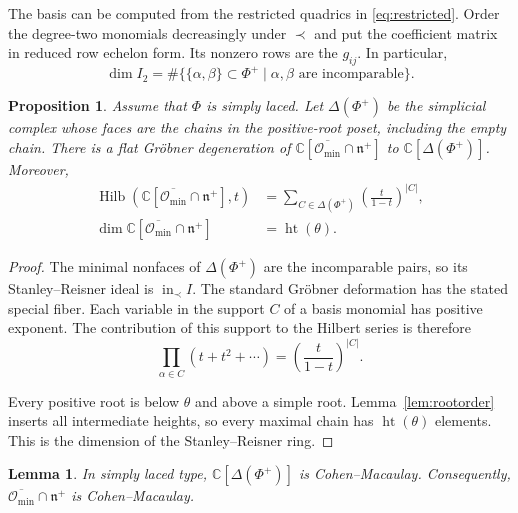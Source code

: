 \documentclass[12pt]{article}
\newtheorem{lemma}[theorem]{Lemma}
\newtheorem{proposition}[theorem]{Proposition}
\theoremstyle{definition}
\DeclareMathOperator{\height}{ht}
\DeclareMathOperator{\inid}{in}
\DeclareMathOperator{\Hilb}{Hilb}
\newcommand{\C}{\mathbb C}
\newcommand{\n}{\mathfrak n^{+}}
\newcommand{\oc}{\overline{\mathcal O_{\min}}}
\begin{document}
The basis can be computed from the restricted quadrics in \eqref{eq:restricted}. Order the degree-two monomials decreasingly under $\prec$ and put the coefficient matrix in reduced row echelon form. Its nonzero rows are the $g_{ij}$. In particular,
$$
    \dim I_2=\#\{\{\alpha,\beta\}\subset\Phi^+\mid
    \alpha,\beta\text{ are incomparable}\}.
$$

\begin{proposition}\label{prop:degeneration}
    Assume that $\Phi$ is simply laced. Let $\Delta(\Phi^+)$ be the simplicial complex whose faces are the chains in the positive-root poset, including the empty chain. There is a flat Gr\"obner degeneration of $\C[\oc\cap\n]$ to $\C[\Delta(\Phi^+)]$. Moreover,
    \begin{align*}
        \Hilb(\C[\oc\cap\n],t)&=\sum_{C\in\Delta(\Phi^+)}
        \left(\frac{t}{1-t}\right)^{|C|},
        \\
        \dim\C[\oc\cap\n]&=\height(\theta).
    \end{align*}
\end{proposition}

\begin{proof}
    The minimal nonfaces of $\Delta(\Phi^+)$ are the incomparable pairs, so its Stanley--Reisner ideal is $\inid_\prec I$. The standard Gr\"obner deformation \cite[\S22]{Pee11} has the stated special fiber. Each variable in the support $C$ of a basis monomial has positive exponent. The contribution of this support to the Hilbert series is therefore
    $$
        \prod_{\alpha\in C}(t+t^2+\cdots)
        =\left(\frac{t}{1-t}\right)^{|C|}.
    $$

    Every positive root is below $\theta$ and above a simple root. Lemma~\ref{lem:rootorder} inserts all intermediate heights, so every maximal chain has $\height(\theta)$ elements. This is the dimension of the Stanley--Reisner ring.
\end{proof}

\begin{lemma}\label{lem:minimal-cm}
    In simply laced type, $\C[\Delta(\Phi^+)]$ is Cohen--Macaulay. Consequently, $\oc\cap\n$ is Cohen--Macaulay.
\end{lemma}
\end{document}
